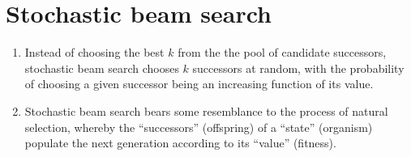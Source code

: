 \section{Stochastic beam search \cite{ai/book/Artificial-Intelligence-A-Modern-Approach/Russell-Norvig}}
\label{AI: Algorithms/stochastic beam search}


\begin{enumerate}
    \item Instead of choosing the best $k$ from the the pool of candidate successors, stochastic beam search chooses $k$ successors at random, with the probability of choosing a given successor being an increasing function of its value.
    \hfill \cite{ai/book/Artificial-Intelligence-A-Modern-Approach/Russell-Norvig}

    \item Stochastic beam search bears some resemblance to the process of natural selection, whereby the “successors” (offspring) of a “state” (organism) populate the next generation according to its “value” (fitness).
    \hfill \cite{ai/book/Artificial-Intelligence-A-Modern-Approach/Russell-Norvig}
\end{enumerate}























